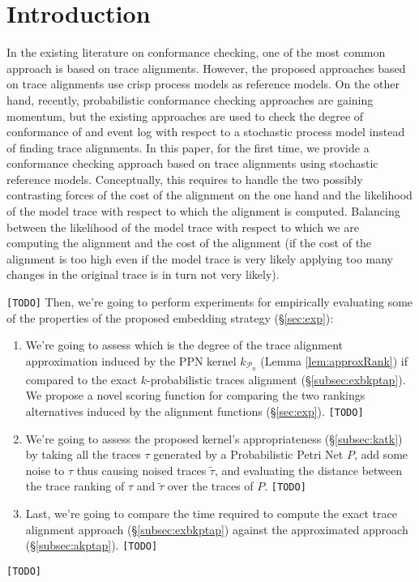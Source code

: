 \section{Introduction}\label{introduction}


In the existing literature on conformance checking, one of the most common approach is based on trace alignments. However, the proposed approaches based on trace alignments use crisp process models as reference models. On the other hand, recently, probabilistic conformance checking approaches are gaining momentum, but the existing approaches are used to check the degree of conformance of and event log with respect to a stochastic process model instead of finding trace alignments.
In this paper, for the first time, we provide a conformance checking approach based on trace alignments using stochastic reference models. Conceptually, this requires to handle the two possibly contrasting forces of the cost of the alignment on the one hand and the likelihood of the model trace with respect to which the alignment is computed.
Balancing between the likelihood of the model trace with respect to which we are computing the alignment and the cost of the alignment (if the cost of the alignment is too high even if the model trace is very likely applying too many changes in the original trace is in turn not very likely).




\texttt{\color{red}[TODO]}
Then, we're going to perform experiments for empirically evaluating some of the properties of the proposed embedding strategy (\S\ref{sec:exp}):
\begin{enumerate}
	\item We're going to assess which is the degree of the trace alignment approximation induced by the PPN kernel $k_{\mathcal{P}_\phi}$ (Lemma \ref{lem:approxRank}) if compared to the exact $k$-probabilistic traces alignment (\S\ref{subsec:exbkptap}). We propose a novel scoring function for comparing the two rankings alternatives induced by the alignment functions (\S\ref{sec:exp}). \texttt{\color{red}[TODO]}
	\item We're going to assess the proposed kernel's appropriateness (\S\ref{subsec:katk}) by taking all the traces $\tau$ generated by a Probabilistic Petri Net $P$, add some noise to $\tau$ thus causing noised traces $\tilde{\tau}$, and evaluating the distance between the trace ranking of $\tau$ and $\tilde{\tau}$ over the traces of $P$. \texttt{\color{red}[TODO]}
	\item Last, we're going to compare the time required to compute the exact trace alignment approach (\S\ref{subsec:exbkptap}) against the approximated approach (\S\ref{subsec:akptap}). \texttt{\color{red}[TODO]}
\end{enumerate}
\texttt{\color{red}[TODO]}